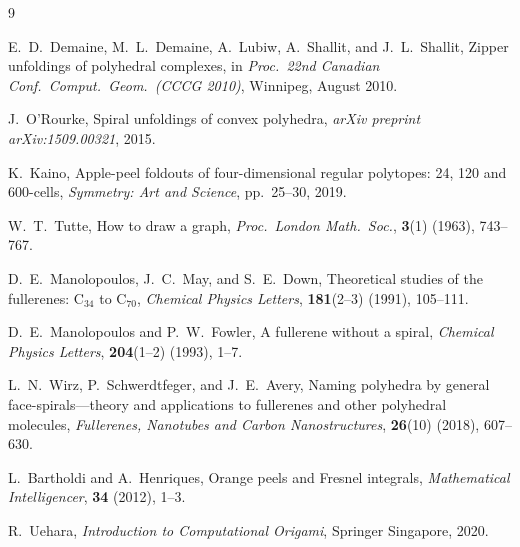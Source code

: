\documentclass[12pt]{article}
\theoremstyle{plain}
\theoremstyle{definition}
\theoremstyle{remark}
\begin{document}
\begin{thebibliography}{9}

E.~D.~Demaine, M.~L.~Demaine, A.~Lubiw, A.~Shallit, and J.~L.~Shallit,
Zipper unfoldings of polyhedral complexes,
in \textit{Proc.\ 22nd Canadian Conf.\ Comput.\ Geom.\ (CCCG 2010)},
Winnipeg, August 2010.

J.~O'Rourke,
Spiral unfoldings of convex polyhedra,
\textit{arXiv preprint arXiv:1509.00321}, 2015.

K.~Kaino,
Apple-peel foldouts of four-dimensional regular polytopes: 24, 120 and
600-cells,
\textit{Symmetry: Art and Science}, pp.~25--30, 2019.

W.~T.~Tutte,
How to draw a graph,
\textit{Proc.\ London Math.\ Soc.}, \textbf{3}(1) (1963), 743--767.

D.~E.~Manolopoulos, J.~C.~May, and S.~E.~Down,
Theoretical studies of the fullerenes: $\mathrm{C}_{34}$ to
$\mathrm{C}_{70}$,
\textit{Chemical Physics Letters}, \textbf{181}(2--3) (1991), 105--111.

D.~E.~Manolopoulos and P.~W.~Fowler,
A fullerene without a spiral,
\textit{Chemical Physics Letters}, \textbf{204}(1--2) (1993), 1--7.

L.~N.~Wirz, P.~Schwerdtfeger, and J.~E.~Avery,
Naming polyhedra by general face-spirals---theory and applications to
fullerenes and other polyhedral molecules,
\textit{Fullerenes, Nanotubes and Carbon Nanostructures},
\textbf{26}(10) (2018), 607--630.

L.~Bartholdi and A.~Henriques,
Orange peels and Fresnel integrals,
\textit{Mathematical Intelligencer}, \textbf{34} (2012), 1--3.

R.~Uehara,
\textit{Introduction to Computational Origami},
Springer Singapore, 2020.

\end{thebibliography}
\end{document}
